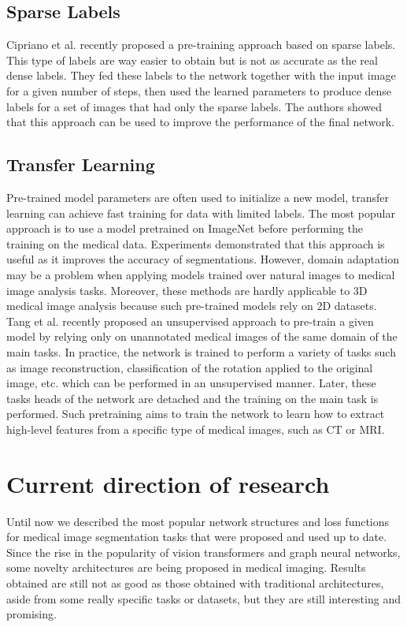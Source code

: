 \subsection{Sparse Labels}
Cipriano et al. \cite{cipriano2022improving} recently proposed a pre-training
approach based on sparse labels. This type of labels are way easier to obtain
but is not as accurate as the real dense labels. They fed these labels to the
network together with the input image for a given number of steps, then used the
learned parameters to produce dense labels for a set of images that had only the
sparse labels. The authors showed that this approach can be used to improve the
performance of the final network.

\subsection{Transfer Learning}
Pre-trained model parameters are often used to initialize a new model,
transfer learning can achieve fast training for data with limited labels. The
most popular approach is to use a model pretrained on ImageNet before performing
the training on the medical data. Experiments demonstrated that this approach is
useful as it improves the accuracy of segmentations. However, domain
adaptation may be a problem when applying models trained over natural images to
medical image analysis tasks. Moreover, these methods are hardly applicable to
3D medical image analysis because such pre-trained models rely on 2D datasets.\\
Tang et al. \cite{tang2022self} recently proposed an unsupervised approach to
pre-train a given model by relying only on unannotated medical images of the
same domain of the main tasks. In practice, the network is trained to perform a
variety of tasks such as image reconstruction, classification of the rotation
applied to the original image, etc. which can be performed in an unsupervised
manner. Later, these tasks heads of the network are detached and the training on
the main task is performed. Such pretraining aims to train the network to learn
how to extract high-level features from a specific type of medical images, such
as CT or MRI.

\section{Current direction of research}
Until now we described the most popular network structures and loss functions
for medical image segmentation tasks that were proposed and used up to date.
Since the rise in the popularity of vision transformers and graph neural
networks, some novelty architectures are being proposed in medical imaging.
Results obtained are still not as good as those obtained with traditional
architectures, aside from some really specific tasks or datasets, but they are
still interesting and promising.

